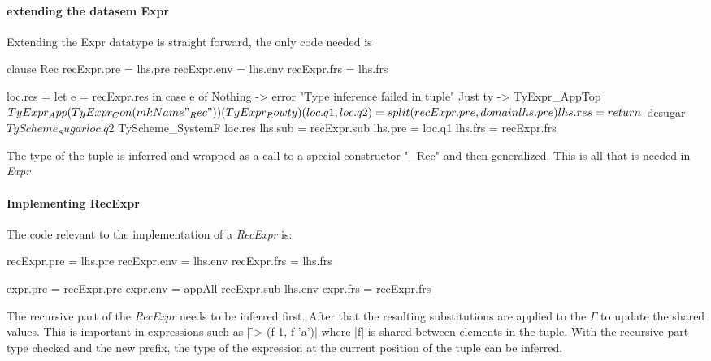 \paragraph{extending the datasem Expr}
Extending the Expr datatype is straight forward, the only code needed is

\begin{code}
clause Rec
   recExpr.pre  = lhs.pre
   recExpr.env  = lhs.env
   recExpr.frs  = lhs.frs
   
   loc.res =  let e = recExpr.res
              in case e of
                   Nothing  ->  error "Type inference failed in tuple"
                   Just ty  ->  TyExpr_AppTop $
                                   TyExpr_App
                                      (TyExpr_Con (mkName "_Rec"))
                                      (TyExpr_Row ty)
   
   (loc.q1, loc.q2) = split (recExpr.pre, domain lhs.pre)
   lhs.res = return  $ desugar 
                     $ TyScheme_Sugar loc.q2 
                     $ TyScheme_SystemF loc.res
   lhs.sub  = recExpr.sub
   lhs.pre  = loc.q1
   lhs.frs  = recExpr.frs
\end{code}
The type of the tuple is inferred and wrapped as a call to a special constructor "\_Rec" and then generalized. This is all that is needed in \emph{Expr}

\paragraph{Implementing RecExpr}
The code relevant to the implementation of a \emph{RecExpr} is:

\begin{code}
   recExpr.pre  = lhs.pre
   recExpr.env  = lhs.env
   recExpr.frs  = lhs.frs
   
   expr.pre  = recExpr.pre
   expr.env  = appAll recExpr.sub lhs.env
   expr.frs  = recExpr.frs
\end{code}
The recursive part of the \emph{RecExpr} needs to be inferred first. After that the resulting substitutions are applied to the $\Gamma$ to update the shared values. This is important in expressions such as |\f -> (f 1, f 'a')| where |f| is shared between elements in the tuple. With the recursive part type checked and the new prefix, the type of the expression at the current position of the tuple can be inferred.

